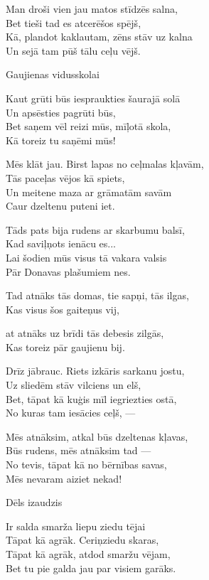 \documentclass[14pt]{extarticle}
\begin{document}
{Man droši vien jau matos stīdzēs salna,\\
Bet tieši tad es atcerēšos spējš,\\
Kā, plandot kaklautam, zēns stāv uz kalna\\
Un sejā tam pūš tālu ceļu vējš.


\newpage

{\large \sc Gaujienas vidusskolai}

Kaut grūti būs iespraukties šaurajā solā\\
Un apsēsties pagrūti būs,\\
Bet saņem vēl reizi mūs, mīļotā skola,\\
Kā toreiz tu saņēmi mūs!

Mēs klāt jau. Birst lapas no ceļmalas kļavām,\\
Tās paceļas vējos kā spiets,\\
Un meitene maza ar grāmatām savām\\
Caur dzeltenu puteni iet.

Tāds pats bija rudens ar skarbumu balsī,\\
Kad saviļņots ienācu es...\\
Lai šodien mūs visus tā vakara valsis\\
Pār Donavas plašumiem nes.

Tad atnāks tās domas, tie sapņi, tās ilgas,\\
Kas visus šos gaiteņus vij,\\
{at atnāks uz brīdi tās debesis zilgās,\\
Kas toreiz pār gaujienu bij.

Drīz jābrauc. Riets izkāris sarkanu jostu,\\
Uz sliedēm stāv vilciens un elš,\\
Bet, tāpat kā kuģis mīl iegriezties ostā,\\
No kuras tam iesācies ceļš, ---

Mēs atnāksim, atkal būs dzeltenas kļavas,\\
Būs rudens, mēs atnāksim tad ---\\
No tevis, tāpat kā no bērnības savas,\\
Mēs nevaram aiziet nekad!

\newpage

{\large \sc Dēls izaudzis}

Ir salda smarža liepu ziedu tējai\\
Tāpat kā agrāk. Ceriņziedu skaras,\\
Tāpat kā agrāk, atdod smaržu vējam,\\
Bet tu pie galda jau par visiem garāks.

}}
\end{document}
